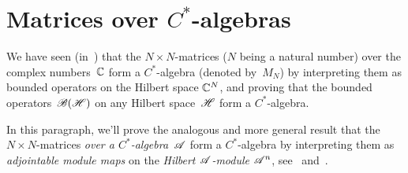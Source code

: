 \documentclass[a]{subfiles}
\begin{document}
\section{Matrices over $C^*$-algebras}
\begin{parsec}%
\begin{point}%
We have seen (in~) that the $N\times N$-matrices
($N$ being a natural number) over the complex numbers~$\mathbb{C}$
form a $C^*$-algebra (denoted by~$M_N$) by interpreting
them as bounded operators on the Hilbert space $\mathbb{C}^N$,
and proving
that the bounded operators~$\mathscr{B}(\mathscr{H})$
on any Hilbert space~$\mathscr{H}$ form a $C^*$-algebra.

In this paragraph, we'll prove the analogous
and more general
result that the 
$N\times N$-matrices \emph{over a $C^*$-algebra~$\mathscr{A}$}
form a $C^*$-algebra by interpreting them
as \emph{adjointable module maps} on
the \emph{Hilbert $\mathscr{A}$-module} $\mathscr{A}^n$,
see~ and~.
\end{point}
\end{parsec}
\end{document}
